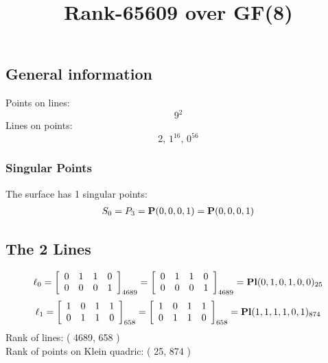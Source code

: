 \documentclass{article}
\newcommand\setTBstruts{\def\T{\rule{0pt}{2.6ex}}%
\def\B{\rule[-1.2ex]{0pt}{0pt}}}
\newcommand{\bP}{{\bf P}}
\begin{document}
 
\setTBstruts



{\allowdisplaybreaks%






\title{Rank-65609 over GF(8)}
\author{}%
\maketitle%
%
{}



\subsection*{General information}
Points on lines:
$$
9^2$$
Lines on points:
$$
2,\,1^{16},\,0^{56}$$
\subsubsection*{Singular Points}
The surface has 1 singular points:\\
\begin{align*}
S_{0} &= P_{3}=\bP(0, 0, 0, 1) = \bP(0, 0, 0, 1)\\
\end{align*}
\subsection*{The 2 Lines}
$$
\ell_{0} = 
\left[
\begin{array}{*{4}{r}}
0 & 1 & 1 & 0\\
0 & 0 & 0 & 1\\
\end{array}
\right]
_{4689}
=
\left[
\begin{array}{*{4}c}
0  & 1  & 1  & 0\\
0  & 0  & 0  & 1\\
\end{array}
\right]_{4689}
={\rm\bf Pl}(0,1,0,1,0,0 )_{25}$$
$$
\ell_{1} = 
\left[
\begin{array}{*{4}{r}}
1 & 0 & 1 & 1\\
0 & 1 & 1 & 0\\
\end{array}
\right]
_{658}
=
\left[
\begin{array}{*{4}c}
1  & 0  & 1  & 1\\
0  & 1  & 1  & 0\\
\end{array}
\right]_{658}
={\rm\bf Pl}(1,1,1,1,0,1 )_{874}$$
Rank of lines: ( 4689, 658 )\\
Rank of points on Klein quadric: ( 25, 874 )\\
}
\end{document}
